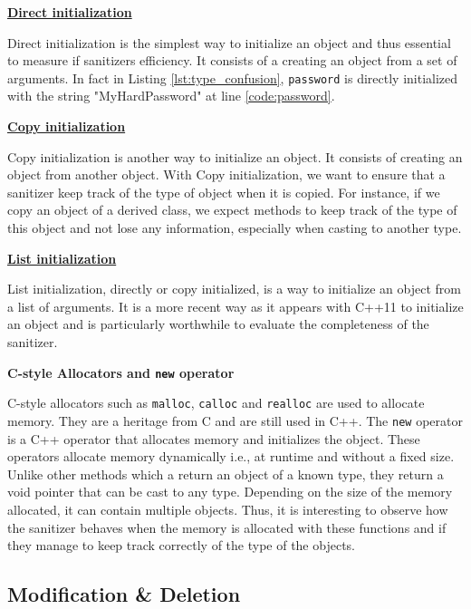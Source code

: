\documentclass[a4paper,11pt,oneside]{report}
\begin{document}
\textbf{\href{https://en.cppreference.com/w/cpp/language/direct_initialization}{Direct
initialization}}

\noindent{}Direct initialization is the simplest way to initialize an object and
thus essential to measure if sanitizers efficiency. It consists of a creating an
object from a set of arguments.  In fact in Listing
\autoref{lst:type_confusion}, \texttt{password} is directly initialized with the
string "MyHardPassword" at line \ref{code:password}.

\textbf{\href{https://en.cppreference.com/w/cpp/language/copy_initialization}{Copy
initialization}}

\noindent{}Copy initialization is another way to initialize an object. 
It consists of creating an object from another object. 
With Copy initialization, we want to ensure that a sanitizer keep track of the 
type of object when it is copied. For instance, if we copy an
object of a derived class, we expect methods to keep track of the type of this object
and not lose any information, especially when casting to another type.

\textbf{\href{https://en.cppreference.com/w/cpp/language/list_initialization}{List
initialization}}

\noindent{}List initialization, directly or copy initialized, is a way to
initialize an object from a list of arguments.  It is a more recent way as it appears with 
C++11 to initialize an object and is particularly worthwhile to evaluate the completeness
of the sanitizer.

\textbf{C-style Allocators and \texttt{new} operator}

\noindent{}C-style allocators such as \texttt{malloc}, \texttt{calloc} and \texttt{realloc}
are used to allocate memory. They are a heritage from C and are still used in C++.
The \texttt{new} operator is a C++ operator that allocates memory and initializes the object.
These operators allocate memory dynamically i.e., at runtime and without a fixed size.
Unlike other methods which a return an object of a known type,
they return a void pointer that can be cast to any type. 
Depending on the size of the memory allocated, it can contain
multiple objects.  Thus, it is interesting to observe how the sanitizer behaves
when the memory is allocated with these functions and if they manage to keep
track correctly of the type of the objects.

\subsection{Modification \& Deletion}
\end{document}
